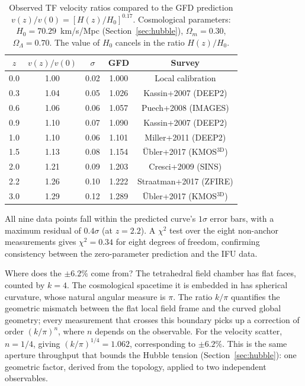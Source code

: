 \documentclass[aps,prd,preprint,superscriptaddress,showpacs,preprintnumbers,amsmath,amssymb,nofootinbib]{revtex4-2}
\begin{document}
\begin{table}[t]
\caption{Observed TF velocity ratios compared to the GFD prediction $v(z)/v(0) = [H(z)/H_0]^{0.17}$. Cosmological parameters: $H_0 = 70.29$~km/s/Mpc (Section~\ref{sec:hubble}), $\Omega_m = 0.30$, $\Omega_\Lambda = 0.70$. The value of $H_0$ cancels in the ratio $H(z)/H_0$.}
\label{tab:observations}
\begin{ruledtabular}
\begin{tabular}{ccccc}
$z$ & $v(z)/v(0)$ & $\sigma$ & GFD & Survey \\
\hline
0.0 & 1.00 & 0.02 & 1.000 & Local calibration \\
0.3 & 1.04 & 0.05 & 1.026 & Kassin+2007 (DEEP2) \\
0.6 & 1.06 & 0.06 & 1.057 & Puech+2008 (IMAGES) \\
0.9 & 1.10 & 0.07 & 1.090 & Kassin+2007 (DEEP2) \\
1.0 & 1.10 & 0.06 & 1.101 & Miller+2011 (DEEP2) \\
1.5 & 1.13 & 0.08 & 1.154 & \"{U}bler+2017 (KMOS$^{\mathrm{3D}}$) \\
2.0 & 1.21 & 0.09 & 1.203 & Cresci+2009 (SINS) \\
2.2 & 1.26 & 0.10 & 1.222 & Straatman+2017 (ZFIRE) \\
3.0 & 1.29 & 0.12 & 1.289 & \"{U}bler+2017 (KMOS$^{\mathrm{3D}}$) \\
\end{tabular}
\end{ruledtabular}
\end{table}

All nine data points fall within the predicted curve's $1\sigma$ error bars, with a maximum residual of $0.4\sigma$ (at $z = 2.2$). A $\chi^2$ test over the eight non-anchor measurements gives $\chi^2 = 0.34$ for eight degrees of freedom, confirming consistency between the zero-parameter prediction and the IFU data.

Where does the $\pm 6.2\%$ come from? The tetrahedral field chamber has flat faces, counted by $k = 4$. The cosmological spacetime it is embedded in has spherical curvature, whose natural angular measure is $\pi$. The ratio $k/\pi$ quantifies the geometric mismatch between the flat local field frame and the curved global geometry; every measurement that crosses this boundary picks up a correction of order $(k/\pi)^n$, where $n$ depends on the observable. For the velocity scatter, $n = 1/4$, giving $(k/\pi)^{1/4} = 1.062$, corresponding to $\pm 6.2\%$. This is the same aperture throughput that bounds the Hubble tension (Section~\ref{sec:hubble}): one geometric factor, derived from the topology, applied to two independent observables.
\end{document}
